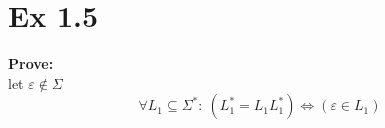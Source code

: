 \section*{Ex 1.5}
\begin{mdframed}
	\textbf{Prove:} \\
	let $\varepsilon \notin \Sigma$
	\[
		\forall L_1 \subseteq \Sigma^* :\: (L_1^* = L_1 L_1^*) \iff (\varepsilon \in L_1)
	\]
\end{mdframed}





